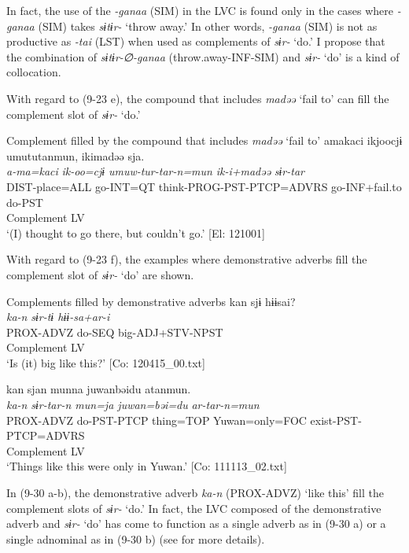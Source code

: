 In fact, the use of the \textit{{}-ganaa} (SIM) in the LVC is found only in the cases where \textit{{}-ganaa} (SIM) takes \textit{sɨtɨr-} ‘throw away.’ In other words, \textit{{}-ganaa} (SIM) is not as productive as \textit{{}-tai} (LST) when used as complements of \textit{sɨr-} ‘do.’ I propose that the combination of \textit{sɨtɨr-∅-ganaa} (throw.away-INF-SIM) and \textit{sɨr-} ‘do’ is a kind of collocation.

With regard to (9-23 e), the compound that includes \textit{madəə} ‘fail to’ can fill the complement slot of \textit{sɨr-} ‘do.’

\ea   Complement filled by the compound that includes \textit{madəə} ‘fail to’ \label{ex:9.29}
 \gllll  amakaci  ikjoocjɨ  umututanmun,   ikimadəə  sja.  \\
    \textit{a-ma=kaci}  \textit{ik-oo=cjɨ}  \textit{umuw-tur-tar-n=mun}    \textit{ik-i+madəə}  \textit{sɨr{}-tar} \\
    DIST-place=ALL  go-INT=QT  think-PROG-PST-PTCP=ADVRS  go-INF+fail.to  do-PST  \\
                                                           Complement  LV  \\
  \glt     ‘(I) thought to go there, but couldn’t go.’ [El: 121001]
\z

With regard to (9-23 f), the examples where demonstrative adverbs fill the complement slot of \textit{sɨr-} ‘do’ are shown.

\ea   Complements filled by demonstrative adverbs \label{ex:9.30}
\ea %
 \gllll  kan  sjɨ  hɨɨsai?\\
      \textit{ka-n}  \textit{sɨr{}-tɨ  hɨɨ-sa+ar-i}\\
      PROX-ADVZ  do-SEQ  big-ADJ+STV-NPST\\
      Complement  LV  \\
    \glt       ‘Is (it) big like this?’ [Co: 120415\_00.txt]

  \ex %
  \glll kan  sjan  munna  juwanbəidu   atanmun.\\
      \textit{ka-n}  \textit{sɨr{}-tar-n  mun=ja  juwan=bəi=du} \textit{ar-tar-n=mun}\\
      PROX-ADVZ  do-PST-PTCP  thing=TOP  Yuwan=only=FOC exist-PST-PTCP=ADVRS\\
      Complement  LV\\      
      \glt ‘Things like this were only in Yuwan.’   [Co: 111113\_02.txt]
    \z
\z

In (9-30 a-b), the demonstrative adverb \textit{ka-n} (PROX-ADVZ) ‘like this’ fill the complement slots of \textit{sɨr-} ‘do.’ In fact, the LVC composed of the demonstrative adverb and \textit{sɨr-} ‘do’ has come to function as a single adverb as in (9-30 a) or a single adnominal as in (9-30 b) (see  for more details).

